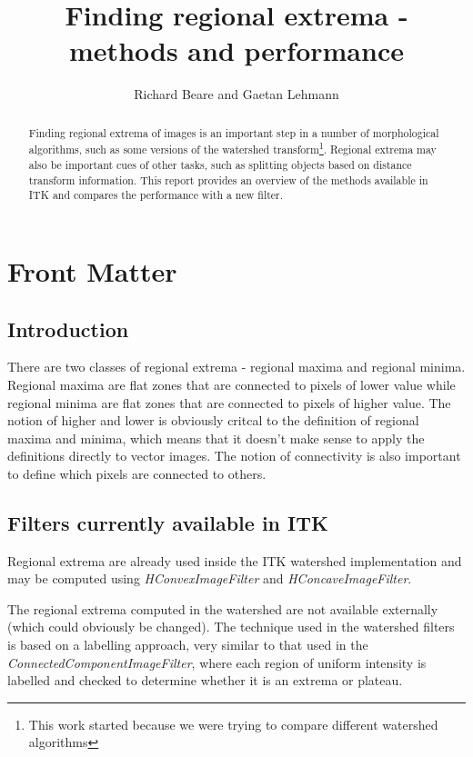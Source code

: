 \documentclass{InsightArticle}
\title{Finding regional extrema - methods and performance}
\author{Richard Beare and Gaetan Lehmann}
\begin{document}
\maketitle

\ifhtml
\chapter*{Front Matter\label{front}}
\fi

\begin{abstract}
\noindent
Finding regional extrema of images is an important step in a number of
morphological algorithms, such as some versions of the watershed
transform\footnote{This work started because we were trying to compare
different watershed algorithms}. Regional extrema may also be
important cues of other tasks, such as splitting objects based on
distance transform information. This report provides an overview of
the methods available in ITK and compares the performance with a new
filter.
\end{abstract}


\section{Introduction}
There are two classes of regional extrema - regional maxima and
regional minima. Regional maxima are flat zones that are connected to
pixels of lower value while regional minima are flat zones that are
connected to pixels of higher value. The notion of higher and lower is
obviously critcal to the definition of regional maxima and minima,
which means that it doesn't make sense to apply the definitions
directly to vector images. The notion of connectivity is also important
to define which pixels are connected to others.

\section{Filters currently available in ITK}
Regional extrema are already used inside the ITK watershed
implementation and may be computed using {\em HConvexImageFilter}
and {\em HConcaveImageFilter}. 

The regional extrema computed in the watershed are not available
externally (which could obviously be changed). The technique used in
the watershed filters is based on a labelling approach, very similar
to that used in the {\em ConnectedComponentImageFilter}, where each
region of uniform intensity is labelled and checked to determine
whether it is an extrema or plateau.
\end{document}

